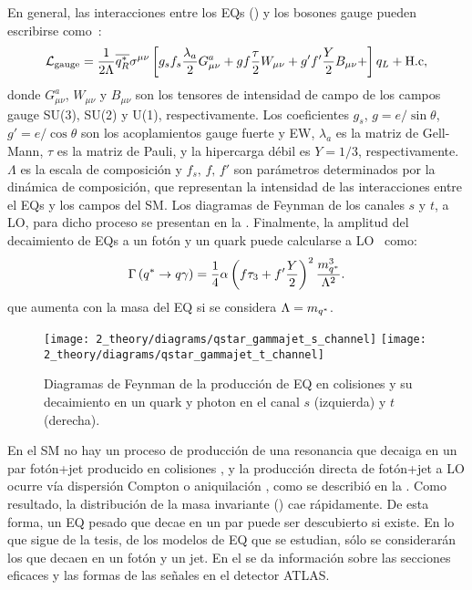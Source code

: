 En general, las interacciones entre los \acp{EQ} (\qstar) y los bosones gauge pueden escribirse como~\cite{Zhan_Li_Liu_Li-2016}:
\begin{equation}
    \mathcal{L}_{\text{gauge}} = 
    \frac{1}{2\Lambda}
    \overline{q^{*}_R}
    \sigma^{\mu\nu}
    \left[
        g_s f_s \frac{\lambda_a}{2} G_{\mu\nu}^a +
        g f \frac{\tau}{2} W_{\mu\nu} +
        g' f' \frac{Y}{2} B_{\mu\nu} +
    \right]
    q_L
    + \text{H.c},
\end{equation}
donde \(G_{\mu\nu}^a\), \(W_{\mu\nu}\) y \(B_{\mu\nu}\) son los tensores de intensidad de campo de los campos gauge SU(3), SU(2) y U(1), respectivamente. Los coeficientes \(g_s\), \(g = e / \sin \theta\), \(g' = e / \cos \theta\) son los acoplamientos gauge fuerte y \ac{EW}, \(\lambda_a\) es la matriz de Gell-Mann, \(\tau\) es la matriz de Pauli, y la hipercarga débil es \(Y = 1/3\), respectivamente. \(\Lambda\) es la escala de composición y \(f_s, \, f, \, f'\) son parámetros determinados por la dinámica de composición, que representan la intensidad de las interacciones entre el \acp{EQ} y los campos del \ac{SM}. Los diagramas de Feynman de los canales \(s\) y \(t\), a \ac{LO}, para dicho proceso se presentan en la \Fig{\ref{fig:theory:bsm:diagrams}}. Finalmente, la amplitud del decaimiento de \acp{EQ} a un fotón y un quark puede calcularse a \ac{LO}~\cite{Zhan_Li_Liu_Li-2016} como:
\begin{equation}
    \Gamma\left(q^{*} \rightarrow q \gamma\right) =
    \frac{1}{4}
    \alpha
    \left(f \tau_3 + f' \frac{Y}{2}\right)^2
    \frac{m_{q^*}^3}{\Lambda^2}.
\end{equation}
que aumenta con la masa \mq del \ac{EQ} si se considera \(\Lambda = m_{q^*}\).


\begin{figure}[ht!]
    \centering
    \texttt{[image: 2\_theory/diagrams/qstar\_gammajet\_s\_channel]}
    \hspace{1cm}
    \texttt{[image: 2\_theory/diagrams/qstar\_gammajet\_t\_channel]}
    \caption{Diagramas de Feynman de la producci\'on de \ac{EQ} en colisiones \pp y su decaimiento en un quark y photon en el canal \(s\) (izquierda) y \(t\) (derecha).}
    \label{fig:theory:bsm:diagrams}
\end{figure}


En el \ac{SM} no hay un proceso de producción de una resonancia que decaiga en un par fotón+jet producido en colisiones \pp, y la producción directa de fotón+jet a \ac{LO} ocurre vía dispersión Compton o aniquilación \qqbar, como se describi\'o en la \Sect{\ref{subsec:theory:sm:prompt_photon}}. Como resultado, la distribución de la masa invariante \gammajet (\myj) cae rápidamente. De esta forma, un \ac{EQ} pesado que decae en un par \gammajet puede ser descubierto si existe. En lo que sigue de la tesis, de los modelos de \ac{EQ} que se estudian, s\'olo se considerar\'an los que decaen en un fot\'on y un jet. En el \Ch{\ref{ch:samples}} se da información sobre las secciones eficaces y las formas de las señales en el detector \ac{ATLAS}.


